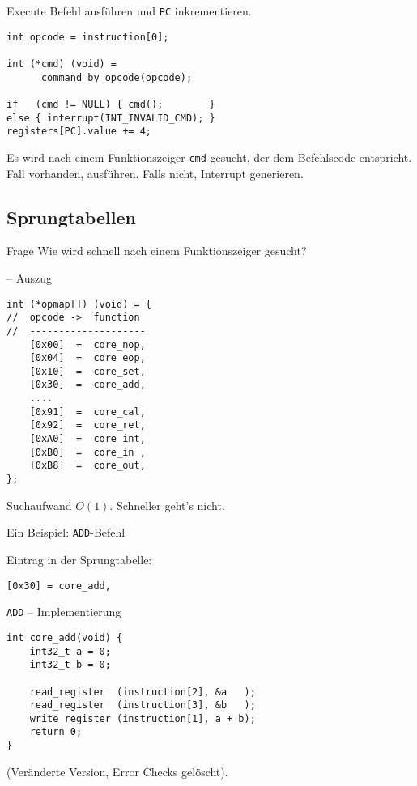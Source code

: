 \begin{frame}[fragile]{Execute}
 Befehl ausführen und \texttt{PC} inkrementieren.

\begin{lstlisting}
int opcode = instruction[0];

int (*cmd) (void) =
      command_by_opcode(opcode);

if   (cmd != NULL) { cmd();        } 
else { interrupt(INT_INVALID_CMD); }
registers[PC].value += 4;
\end{lstlisting}

Es wird nach einem Funktionszeiger \texttt{cmd} gesucht, der dem Befehlscode
entspricht.
Fall vorhanden, ausführen. Falls nicht, Interrupt generieren.
\end{frame}


\subsection{Sprungtabellen}

\begin{frame}{Frage}
  Wie wird schnell nach einem Funktionszeiger gesucht?
\end{frame}


\begin{frame}[fragile]{\insertsubsection{} -- Auszug}
\begin{lstlisting}
int (*opmap[]) (void) = {
//  opcode ->  function   
//  --------------------
    [0x00]  =  core_nop,
    [0x04]  =  core_eop,
    [0x10]  =  core_set,
    [0x30]  =  core_add,
    ....
    [0x91]  =  core_cal,
    [0x92]  =  core_ret,
    [0xA0]  =  core_int,
    [0xB0]  =  core_in ,
    [0xB8]  =  core_out,
};
\end{lstlisting}
Suchaufwand $O(1)$. Schneller geht's nicht.
\end{frame}


\begin{frame}[fragile]{Ein Beispiel: \texttt{ADD}-Befehl}
\begin{center}
  
\end{center}
 
Eintrag in der Sprungtabelle:
\begin{lstlisting}
[0x30] = core_add,
\end{lstlisting}
\end{frame}


\begin{frame}[fragile]{\texttt{ADD} -- Implementierung}
\begin{lstlisting}
int core_add(void) {
    int32_t a = 0; 
    int32_t b = 0;

    read_register  (instruction[2], &a   );
    read_register  (instruction[3], &b   );
    write_register (instruction[1], a + b);       
    return 0;
}
\end{lstlisting}
(Veränderte Version, Error Checks gelöscht).
\end{frame}



